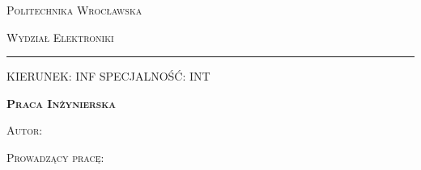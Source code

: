\begin{titlepage}
\begin{center}
	\begin{Huge}
		\textsc{Politechnika Wrocławska}
	\end{Huge}

	\begin{huge}
		\vspace{1ex}
		\textsc{Wydział Elektroniki}
	\end{huge}
	\rule[-0.3ex]{\textwidth}{1pt}

	\begin{flushleft}
		\begin{large}
			\vspace{0.7cm}
			\textsc{KIERUNEK: INF} \newline
			\textsc{SPECJALNOŚĆ: INT}
		\end{large}
	\end{flushleft}

	\begin{center}
		\begin{Huge}
			\vspace{2ex}
			\textsc{\textbf{Praca Inżynierska}}
			\vspace{2ex}
		\end{Huge}
	\end{center}
	\vspace{2cm}
	\begin{flushright}
		\begin{minipage}[t]{9.68cm}
			\begin{center}
				\begin{large}
					\temat
				\end{large}

				\vspace{0.5cm}
				\begin{large}
					\tematen
				\end{large}

				\vspace{1cm}
				\begin{large}
					\textsc{Autor:}
				\end{large}

				\begin{large}
					\autor
				\end{large}
			\end{center}
			\begin{flushleft}
				\begin{large}
					\vspace{5ex}
					\textsc{Prowadzący pracę:}\newline
					\prowadzacy\newline


\end{large}
\end{flushleft}
\end{minipage}
\end{flushright}
\end{center}
\end{titlepage}
